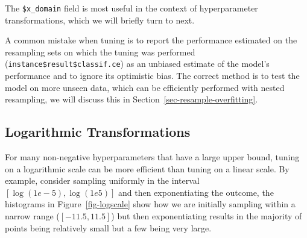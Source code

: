 The \texttt{\$x\_domain} field is most useful in the context of
hyperparameter transformations, which we will briefly turn to next.

\begin{tcolorbox}[enhanced jigsaw, opacitybacktitle=0.6, rightrule=.15mm, opacityback=0, arc=.35mm, breakable, titlerule=0mm, colframe=quarto-callout-warning-color-frame, coltitle=black, bottomrule=.15mm, toprule=.15mm, colback=white, colbacktitle=quarto-callout-warning-color!10!white, bottomtitle=1mm, toptitle=1mm, title=\textcolor{quarto-callout-warning-color}{\faExclamationTriangle}\hspace{0.5em}{Overconfident Performance Estimates}, leftrule=.75mm, left=2mm]

A common mistake when tuning is to report the performance estimated on
the resampling sets on which the tuning was performed
(\texttt{instance\$result\$classif.ce}) as an unbiased estimate of the
model's performance and to ignore its optimistic bias. The correct
method is to test the model on more unseen data, which can be
efficiently performed with nested resampling, we will discuss this in
Section~\ref{sec-resample-overfitting}.

\end{tcolorbox}

\hypertarget{sec-logarithmic-transformations}{%
\subsection{Logarithmic
Transformations}\label{sec-logarithmic-transformations}}

For many non-negative hyperparameters that have a large upper bound,
tuning on a logarithmic scale can be more efficient than tuning on a
linear scale. By example, consider sampling uniformly in the interval
\([\log(1e-5), \log(1e5)]\) and then exponentiating the outcome, the
histograms in Figure~\ref{fig-logscale} show how we are initially
sampling within a narrow range (\([-11.5, 11.5]\)) but then
exponentiating results in the majority of points being relatively small
but a few being very large.

\begin{Shaded}
\begin{Highlighting}[]
\OtherTok{=} \NormalTok{(}\NormalTok{, }\NormalTok{(}\NormalTok{), }\NormalTok{(}\NormalTok{))}
\OtherTok{=} 
\end{Highlighting}
\end{Shaded}

